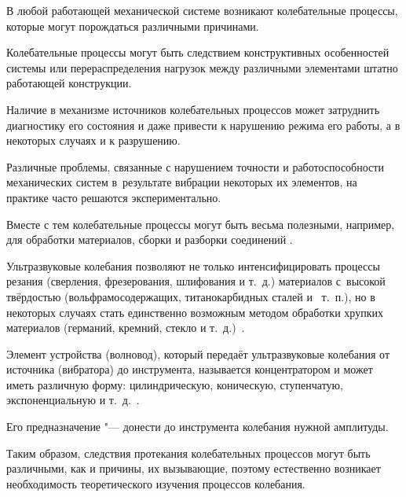 



\makerutitle



\smallskip



 В любой работающей механической системе возникают колебательные процессы, которые могут порождаться различными причинами. 

Колебательные процессы могут быть следствием конструктивных особенностей системы или перераспределения нагрузок между различными элементами штатно работающей конструкции.



Наличие в механизме источников колебательных процессов может затруднить диагностику его состояния и даже привести к нарушению режима его работы, а в некоторых случаях и к разрушению.

Различные проблемы, связанные с нарушением точности и работоспособности механических систем в~результате вибрации некоторых их элементов, на практике часто решаются экспериментально.



Вместе с тем колебательные процессы могут быть весьма полезными,  например, для обработки материалов, сборки и разборки соединений  \cite[с.~3,~4]{NERU}.

Ультразвуковые колебания позволяют не только интенсифицировать процессы  резания (сверления, фрезерования, шлифования и т.~д.) материалов с~высокой твёрдостью (вольфрамосодержащих, титанокарбидных сталей и~ т.~п.), но в некоторых случаях стать единственно возможным методом  обработки хрупких материалов (германий, кремний, стекло и т.~д.)~\cite[с.~3]{Xmel}. 

Элемент устройства (волновод), который  передаёт ультразвуковые колебания от источника (вибратора) до  инструмента, называется концентратором и может иметь различную форму:  цилиндрическую, коническую, ступенчатую, экспоненциальную и т.~д.~\cite[с. 174]{Kum}. 

Его предназначение "--- донести до инструмента колебания нужной амплитуды.



Таким образом, следствия протекания колебательных процессов могут быть различными, как и причины, их вызывающие, поэтому естественно возникает необходимость теоретического изучения процессов колебания.

